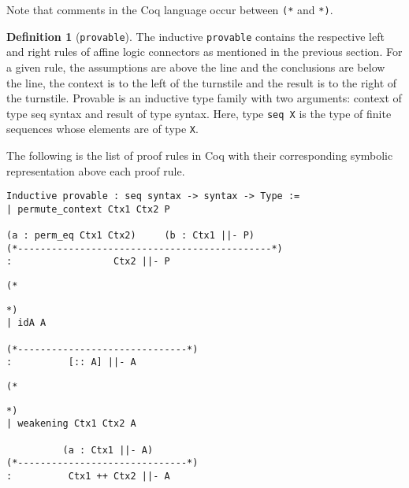 \documentclass{article}
\theoremstyle{definition}
\newtheorem{defn}{Definition}
\begin{document}
Note that comments in the Coq language occur between \verb|(*| and \verb|*)|.

\begin{defn}[\texttt{provable}]
The inductive \verb|provable| contains the respective left and right rules of affine logic connectors as mentioned in the previous section. For a given rule, the assumptions are above the line and the conclusions are below the line, the context is to the left of the turnstile and the result is to the right of the turnstile. Provable is an inductive type family with two arguments: context of type seq syntax and result of type syntax. Here, type \verb|seq X| is the type of finite sequences whose elements are of type \verb|X|.
\end{defn}

The following is the list of proof rules in Coq with their corresponding symbolic representation above each proof rule.

\begin{verbatim}
Inductive provable : seq syntax -> syntax -> Type :=
| permute_context Ctx1 Ctx2 P 

(a : perm_eq Ctx1 Ctx2)     (b : Ctx1 ||- P)
(*---------------------------------------------*)
:                  Ctx2 ||- P

\end{verbatim}
\noindent\begin{minipage}{\textwidth}
\begin{verbatim}
(*
\end{verbatim}
\begin{center}\usebox{\idRule}\end{center}
\begin{verbatim}
*)
| idA A

(*------------------------------*)
:          [:: A] ||- A
\end{verbatim}
\end{minipage}

\noindent\begin{minipage}{\textwidth}
\begin{verbatim}
(*
\end{verbatim}
\begin{center}\usebox{\weakening}\end{center}
\begin{verbatim}
*)
| weakening Ctx1 Ctx2 A

          (a : Ctx1 ||- A)
(*------------------------------*)
:          Ctx1 ++ Ctx2 ||- A
\end{verbatim}
\end{minipage}
\end{document}
